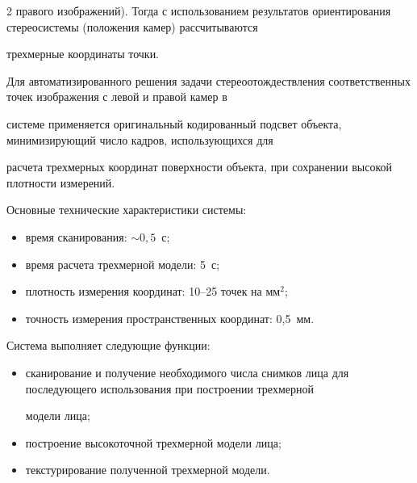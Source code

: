 \begin{multicols}{2}
правого изображений). Тогда с использованием результатов ориентирования стереосистемы (положения камер) рассчитываются 


трехмерные координаты точки.





Для автоматизированного решения задачи стереоотождествления соответственных точек изображения с левой и правой камер в 


системе применяется оригинальный кодированный подсвет объекта, минимизирующий число кадров, использующихся для 


расчета трехмерных координат поверхности объекта, при сохранении высокой плотности измерений. 





Основные технические характеристики сис\-темы:


\begin{itemize}


\item время сканирования: $\sim  0{,}5$~с; 


\item время расчета трехмерной модели: 5~с;


\item плотность измерения координат: 10--25 точек на мм$^2$;


\item точность измерения пространственных координат: 0,5~мм.


\end{itemize}





Система выполняет следующие функции: 


\begin{itemize}


\item сканирование и получение необходимого числа снимков лица для последующего использования при построении трехмерной 


модели лица;


\item построение высокоточной трехмерной модели лица;


\item текстурирование полученной трехмерной модели.


\end{itemize}






\end{multicols}
